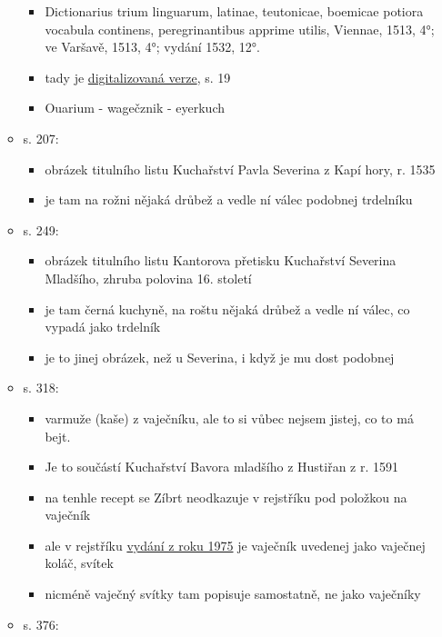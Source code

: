 \begin{itemize}
\begin{itemize}
    \begin{itemize}
    \tightlist
    \item
      Dictionarius trium linguarum, latinae, teutonicae, boemicae
      potiora vocabula continens, peregrinantibus apprime utilis,
      Viennae, 1513, 4°; ve Varšavě, 1513, 4°; vydání 1532, 12°.
    \item
      tady je
      \href{https://dbc.wroc.pl/dlibra/publication/33643/edition/30385/content?ref=L3B1YmxpY2F0aW9uLzM0Njg5L2VkaXRpb24vMzE0MTQ}{digitalizovaná
      verze}, s. 19
    \item
      Ouarium - wagečznik - eyerkuch
    \end{itemize}
  \item
    s. 207:

    \begin{itemize}
    \tightlist
    \item
      obrázek titulního listu Kuchařství Pavla Severina z Kapí hory, r.
      1535
    \item
      je tam na rožni nějaká drůbež a vedle ní válec podobnej trdelníku
    \end{itemize}
  \item
    s. 249:

    \begin{itemize}
    \tightlist
    \item
      obrázek titulního listu Kantorova přetisku Kuchařství Severina
      Mladšího, zhruba polovina 16. století
    \item
      je tam černá kuchyně, na roštu nějaká drůbež a vedle ní válec, co
      vypadá jako trdelník
    \item
      je to jinej obrázek, než u Severina, i když je mu dost podobnej
    \end{itemize}
  \item
    s. 318:

    \begin{itemize}
    \tightlist
    \item
      varmuže (kaše) z vaječníku, ale to si vůbec nejsem jistej, co to
      má bejt.
    \item
      Je to součástí Kuchařství Bavora mladšího z Hustiřan z r. 1591
    \item
      na tenhle recept se Zíbrt neodkazuje v rejstříku pod položkou na
      vaječník
    \item
      ale v rejstříku
      \href{https://ndk.cz/uuid/uuid:27bccb70-88d6-11e3-997d-005056827e52}{vydání
      z roku 1975} je vaječník uvedenej jako vaječnej koláč, svítek
    \item
      nicméně vaječný svítky tam popisuje samostatně, ne jako vaječníky
    \end{itemize}
  \item
    s. 376:


\end{itemize}
\end{itemize}
